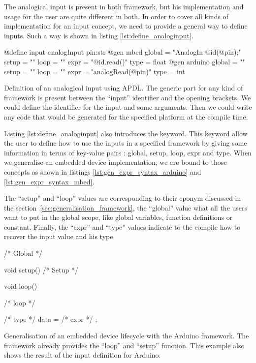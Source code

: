The analogical input is present in both framework, but his implementation and
usage for the user are quite different in both. In order to cover all kinds of
implementation for an input concept, we need to provide a general way to define
inputs. Such a way is shown in listing \ref{lst:define_analoginput}.

\begin{listing}[H]
  \centering
\begin{apdlcode}
@define input analogInput pin:str {
    @gen mbed {
        global = "AnalogIn @id(@pin);"
        setup = ""
        loop = ""
        expr = "@id.read()"
        type = float
    }
    @gen arduino {
        global = ""
        setup = ""
        loop = ""
        expr = "analogRead(@pin)"
        type = int
    }
}
\end{apdlcode}
  \caption[Definition of an analogical input using \gls{APDL}]{Definition of an
analogical input using \gls{APDL}. The generic part for any kind of framework is
present between the ``input'' identifier and the opening brackets. We could
define the identifier for the input and some arguments. Then we could write any
code that would be generated for the specified platform at the compile time.}
  \label{lst:define_analoginput}
\end{listing}

Listing \ref{lst:define_analoginput} also introduces the 
keyword. This keyword allow the user to define how to use the inputs in a
specified framework by giving some information in terms of key-value pairs :
global, setup, loop, expr and type. When we generalise an embedded device
implementation, we are bound to those concepts as shown in listings
\ref{lst:gen_expr_syntax_arduino} and \ref{lst:gen_expr_syntax_mbed}.

The ``setup'' and ``loop'' values are corresponding to their eponym discussed in
the section~\ref{sec:generalisation_framework}, the ``global'' value what all the
users want to put in the global scope, like global variables, function
definitions or constant. Finally, the ``expr'' and ``type'' values indicate to the compile how
to recover the input value and his type.

\begin{listing}[H]
  \centering
\begin{arduinocode}
/* Global */

void setup(){
  /* Setup */
}

void loop(){
  /* loop */

  /* type */ data = /* expr */ ;
}
\end{arduinocode}
  \caption[Generalisation of an embedded device lifecycle with
Arduino]{Generalisation of an embedded device lifecycle with the Arduino
framework. The framework already provides the ``loop'' and ``setup'' function.
This example also shows the result of the input definition for Arduino.}
  \label{lst:gen_expr_syntax_arduino}
\end{listing}

